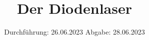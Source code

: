 

\subject{v60}
\title{Der Diodenlaser}
\date{%
  Durchführung: 26.06.2023
  \hspace{3em}
  Abgabe: 28.06.2023
}



\maketitle
\thispagestyle{empty}
\tableofcontents
\newpage






\printbibliography{}


